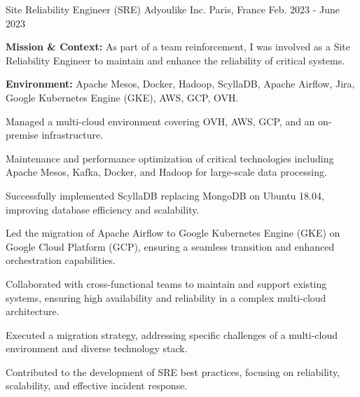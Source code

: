 \begin{cventries}
\cventry
{Site Reliability Engineer (SRE)} %
{Adyoulike Inc.} %
{Paris, France} %
{Feb. 2023 - June 2023} %
{
  \begin{cvitems} %
    \item {\textbf{Mission \& Context:} As part of a team reinforcement, I was involved as a Site Reliability Engineer to maintain and enhance the reliability of critical systems.}
    \item {\textbf{Environment:} Apache Mesos, Docker, Hadoop, ScyllaDB, Apache Airflow, Jira, Google Kubernetes Engine (GKE), AWS, GCP, OVH.}
    \item {Managed a multi-cloud environment covering OVH, AWS, GCP, and an on-premise infrastructure.}
    \item {Maintenance and performance optimization of critical technologies including Apache Mesos, Kafka, Docker, and Hadoop for large-scale data processing.}
    \item {Successfully implemented ScyllaDB replacing MongoDB on Ubuntu 18.04, improving database efficiency and scalability.}
    \item {Led the migration of Apache Airflow to Google Kubernetes Engine (GKE) on Google Cloud Platform (GCP), ensuring a seamless transition and enhanced orchestration capabilities.}
    \item {Collaborated with cross-functional teams to maintain and support existing systems, ensuring high availability and reliability in a complex multi-cloud architecture.}
    \item {Executed a migration strategy, addressing specific challenges of a multi-cloud environment and diverse technology stack.}
    \item {Contributed to the development of SRE best practices, focusing on reliability, scalability, and effective incident response.}
  \end{cvitems}
}


\end{cventries}
